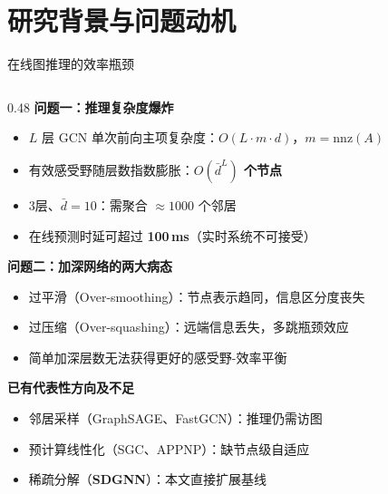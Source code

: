 \documentclass[aspectratio=169,9pt,xcolor=dvipsnames]{beamer}
\newcommand{\highlight}[1]{\textcolor{myred}{\textbf{#1}}}
\newcommand{\blue}[1]{\textcolor{mynavy}{#1}}
\begin{document}
\section{研究背景与问题动机}

\begin{frame}{在线图推理的效率瓶颈}
  \begin{columns}[T]
    \begin{column}{0.48\textwidth}
      \textbf{\highlight{问题一：推理复杂度爆炸}}
      \begin{itemize}
        \item $L$ 层 GCN 单次前向主项复杂度：$O(L\cdot m\cdot d)$，$m=\mathrm{nnz}(A)$
        \item 有效感受野随层数指数膨胀：\highlight{$O(\bar{d}^L)$ 个节点}
        \item 3层、$\bar{d}=10$：需聚合 $\approx1000$ 个邻居
        \item 在线预测时延可超过 \highlight{100\,ms}（实时系统不可接受）
      \end{itemize}

      \vspace{0.25cm}
      \textbf{\highlight{问题二：加深网络的两大病态}}
      \begin{itemize}
        \item \blue{过平滑（Over-smoothing）}：节点表示趋同，信息区分度丧失
        \item \blue{过压缩（Over-squashing）}：远端信息丢失，多跳瓶颈效应
        \item 简单加深层数无法获得更好的感受野-效率平衡
      \end{itemize}

      \vspace{0.25cm}
      \textbf{已有代表性方向及不足}
      \begin{itemize}
        \item 邻居采样（GraphSAGE、FastGCN）：推理仍需访图
        \item 预计算线性化（SGC、APPNP）：缺节点级自适应
        \item 稀疏分解（\highlight{SDGNN}）：本文直接扩展基线
      \end{itemize}
    \end{column}


\end{columns}
\end{frame}
\end{document}
